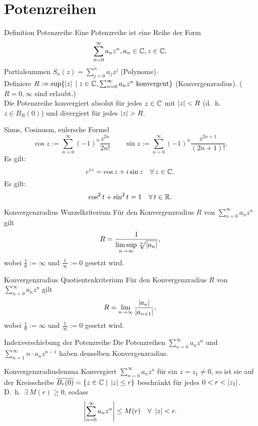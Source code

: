 \documentclass[main.tex]{subfiles}
\begin{document}
\section*{Potenzreihen}

\begin{karte}{Definition Potenzreihe}
    Eine Potenzreihe ist eine Reihe der Form
    \[ \sum_{n=0}^\infty a_n z^n, a_n \in\mathbb{C}, z \in\mathbb{C}. \]
    Partialsummen \( S_n(z) = \sum_{j=0}^n a_j z^j \) (Polynome).\\
    Definiere \( R:= \sup \{ \left| z \right| \;\vert \; z\in\mathbb{C}, 
    \sum_{n=0}^\infty a_n z^n \text{ konvergent} \} \)
    (Konvergenzradius). (\( R = 0, \infty \) sind erlaubt.)\\
    Die Potenzreihe konvergiert absolut für jedes \( z\in\mathbb{C} \) 
    mit \( \left| z \right| < R \) (d.\ h.\  \( z\in B_R(0) \)) 
    und divergiert für jedes \( \left| z \right| > R \).
\end{karte}
\begin{karte}{Sinus, Cosinusm, eulersche Formel}
    \[ \cos z := \sum_{n=0}^\infty {(-1)}^n \frac{z^{2n}}{2n!} 
    \qquad \sin z  := \sum_{n=0}^\infty {(-1)}^n 
    \frac{z^{2n+1}}{(2n+1)!}. \]
    Es gilt:
    \[ e^{iz} = \cos z + i \sin z \quad \forall z\in\C. \]
    Es gilt:
    \[ \cos^2 t + \sin^2 t = 1 \quad \forall t \in \R. \]
\end{karte}
\begin{karte}{Konvergenzradius Wurzelkriterium}
    Für den Konvergenzradius \( R \) von 
    \( \sum_{n=0}^\infty a_n z^n \) gilt
    \[ R = \frac{1}{\limsup\limits_{n\rightarrow\infty} \sqrt[n]{\left| a_n \right|}}, \]
    wobei \(\frac{1}{0} := \infty \) und 
    \( \frac{1}{\infty} := 0 \) gesetzt wird.
\end{karte}
\begin{karte}{Konvergenzradius Quotientenkriterium}
    Für den Konvergenzradius \( R \) von 
    \( \sum_{n=0}^\infty a_n z^n \) gilt
    \[ R = \lim\limits_{n\rightarrow\infty} \frac{\left|  a_n  \right|}{\left|  a_{n+1}  \right|}, \]
    wobei \(\frac{1}{0} := \infty \) und 
    \( \frac{1}{\infty} := 0 \) gesetzt wird.
\end{karte}
\begin{karte}{Indexverschiebung der Potenzreihe}
    Die Potenzreihen \( \sum_{n=0}^\infty a_n z^n \) 
    und \( \sum_{n=1}^\infty n \cdot a_n z^{n-1} \) 
    haben denselben Konvergenzradius.
\end{karte}
\begin{karte}{Konvergenzradiuslemma}%
    Konvergiert \( \sum_{n=0}^\infty a_n z^n \) 
    für ein \( z = z_1 \neq 0 \), so ist sie auf 
    der Kreisscheibe \( \overline{B_r (0)}  
    = \{ z\in\mathbb{C} \;\vert \; \left| z \right|\leq r \} \)
    beschränkt für jedes \( 0 < r < \left| z_1 \right| \).\\
    D.\ h.\  \( \exists \, M(r) \geq 0 \), sodass
    \[ \abs{ \sum_{n=0}^\infty a_n z^n } \leq M(r) 
    \quad \forall \, \abs{z} < r. \]
\end{karte}
\end{document}

